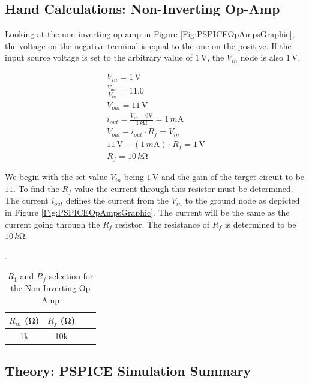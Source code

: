 \documentclass[11pt]{article}
\begin{document}
\subsection{Hand Calculations: Non-Inverting Op-Amp}

Looking at the non-inverting op-amp in Figure \ref{Fig:PSPICEOpAmpsGraphic}, the voltage on the negative terminal is equal to the one on the positive. If the input source voltage is set to the arbitrary value of $1\,\si\volt$, the $V_{in}$ node is also $1\,\si\volt$.

\begin{align}
\label{eq:non}
V_{in} = 1\,\si\volt\\
\frac{V_{out}}{V_{in}} = 11.0\\
V_{out} = 11\,\si\volt\\
i_{out} = \frac{V_{in} - 0\si\volt}{1\,k\si\ohm} = 1\,m\si\ampere\\
V_{out} - i_{out} \cdot R_f = V_{in}\\
11\,\si\volt - (1\,m\si\ampere) \cdot R_f = 1\,\si\volt\\
R_f = 10\,k\si\ohm
\end{align}

We begin with the set value $V_{in}$ being $1\,\si\volt$ and the gain of the target circuit to be $11$. To find the $R_f$ value the current through this resistor must be determined. The current $i_{out}$ defines the current from the $V_{in}$ to the ground node as depicted in Figure \ref{Fig:PSPICEOpAmpsGraphic}. The current will be the same as the current going through the $R_f$ resistor. The resistance of $R_f$ is determined to be $10\,k\si\ohm$.

\begin{table}[h]
	\centering
	\caption{$R_1$ and $R_f$ selection  for the Non-Inverting Op Amp}.
	\label{Table:Lab4NonInvertingOpAmpSelection}
	\begin{tabular}{|c|c|c|c|}
		\hline
		$R_{in}$ (\si{\ohm})& %
		$R_{f}$ (\si{\ohm}) \\
		\hline
		1k & 10k \\	 \hline 
	\end{tabular}
\end{table}

\subsection{Theory: PSPICE Simulation Summary}
\end{document}
